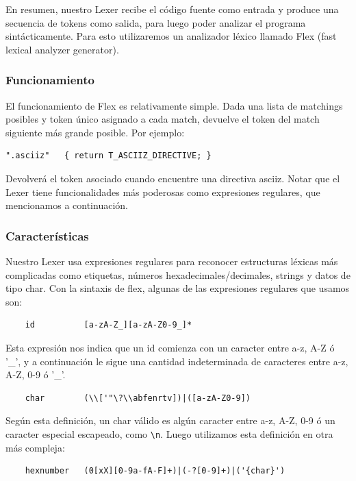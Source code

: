 \documentclass[12pt]{article}
\begin{document}
En resumen, nuestro Lexer recibe el código fuente como entrada y produce una secuencia de tokens como salida, para luego poder analizar el programa sintácticamente.
Para esto utilizaremos un analizador léxico llamado Flex (fast lexical analyzer generator).

\subsubsection{Funcionamiento}
El funcionamiento de Flex es relativamente simple. Dada una lista de matchings posibles y token único asignado a cada match, devuelve el token del match siguiente más grande posible. Por ejemplo:

\begin{verbatim}
".asciiz"	{ return T_ASCIIZ_DIRECTIVE; }
\end{verbatim}

Devolverá el token asociado cuando encuentre una directiva asciiz. Notar que el Lexer tiene funcionalidades más poderosas como expresiones regulares, que mencionamos a continuación.

\subsubsection{Características}
Nuestro Lexer usa expresiones regulares para reconocer estructuras léxicas más complicadas como etiquetas, números hexadecimales/decimales, strings y datos de tipo char. Con la sintaxis de flex, algunas de las expresiones regulares que usamos son:

\begin{verbatim}
    id 			[a-zA-Z_][a-zA-Z0-9_]*
\end{verbatim}

Esta expresión nos indica que un id comienza con un caracter entre a-z, A-Z ó '\_', y a continuación le sigue una cantidad indeterminada de caracteres entre a-z, A-Z, 0-9 ó '\_'.

\begin{verbatim}
    char  		(\\['"\?\\abfenrtv])|([a-zA-Z0-9])
\end{verbatim}

Según esta definición, un char válido es algún caracter entre a-z, A-Z, 0-9 ó un caracter especial escapeado, como \verb!\n!. Luego utilizamos esta definición en otra más compleja:

\begin{verbatim}
    hexnumber 	(0[xX][0-9a-fA-F]+)|(-?[0-9]+)|('{char}')
\end{verbatim}
\end{document}
